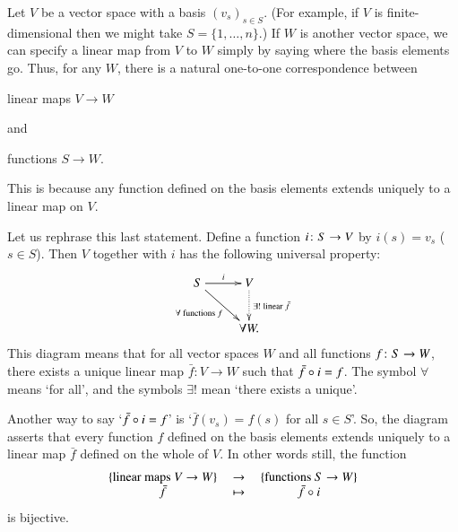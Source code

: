 \begin{iexample} 
\label{eg:univ-basis}
Let $V$ be a vector%
%
%
space with a basis $(v_s)_{s \in S}$.  (For example, if $V$ is
finite-dimensional then we might take $S = \{1, \ldots, n\}$.)  If $W$ is
another vector space, we can specify a linear map from $V$ to $W$ simply by
saying where the basis elements go.  Thus, for any $W$, there is a natural
one-to-one correspondence between
% 
\begin{displaytext}
linear maps $V \to W$
\end{displaytext}
% 
and
% 
\begin{displaytext}
functions $S \to W$.
\end{displaytext}
% 
This is because any function defined on the basis elements extends
uniquely to a linear map on $V$.

Let us rephrase this last statement.  Define a function $i\from S \to V$ by
$i(s) = v_s$ ($s \in S$).  Then $V$ together with $i$ has the following
universal property:
\[ 
\xymatrix{
S \ar[r]^i \ar[dr]_{\forall \text{ functions } f}  &
V \ar@{.>}[d]^{\exists ! \text{ linear } \bar{f}} \\
&
\forall W.
}
\]
This diagram means that for all vector spaces $W$ and all functions $f\from
S \to W$, there exists a unique linear map $\bar{f}: V \to W$ such that
$\bar{f} \mathbin{\circ} i = f$.  The symbol $\forall$%
%
%
means `for all', and the symbols $\exists !$%
% 
%
 mean `there exists a unique'.%
%
%

Another way to say `$\bar{f} \mathbin{\circ} i = f$' is `$\bar{f}(v_s) = f(s)$ for all
$s \in S$'.  So, the diagram asserts that every function $f$ defined on the
basis elements extends uniquely to a linear map $\bar{f}$ defined on the
whole of $V$.  In other words still, the function
\[
\begin{array}{ccc}
\{ \text{linear maps } V \to W \}     &
\ \to \             &
\{ \text{functions } S \to W \}       \\
\bar{f}        &\mapsto        &\bar{f} \mathbin{\circ} i       
\end{array}
\]
is bijective. 
\end{iexample}

